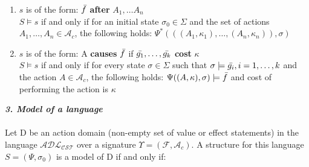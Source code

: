 \documentclass[a4paper]{article}
\begin{document}
\begin{enumerate}
    \item $s$ is of the form: $\Bar{f}$ \textbf{after} $A_1,\dotsc A_n$ \\[0.5\baselineskip]
    $S\models s$ if and only if for an initial state $\sigma_0\in\Sigma$ and the set of actions $A_1,\dotsc,A_n\in\mathcal{A}_c$, the following holds: $\Psi^\ast(((A_1,\kappa_1),\dotsc,(A_n,\kappa_n)),\sigma)$
    \item $s$ is of the form: A \textbf{causes} $\Bar{f}$ if $\Bar{g_1},\dotsc,\Bar{g_k}$ \textbf{cost} $\kappa$ \\[0.5\baselineskip]
    $S\models s$ if and only if for every state $\sigma\in\Sigma$ such that $\sigma\models\Bar{g_i},i=1,\dotsc,k$ and the action $A\in\mathcal{A}_c$, the following holds: $\Psi((A,\kappa),\sigma)\models\Bar{f}$ and cost of performing the action is $\kappa$
\end{enumerate}
\textbf{\textit{3. Model of a language}}
\\ \\
Let D be an action domain (non-empty set of value or effect statements) in the language $\mathcal{ADL_{CST}}$ over a signature $\Upsilon = (\mathcal{F}, \mathcal{A}_c)$. A structure for this language $S=(\Psi,\sigma_0)$ is a model of D if and only if:
\end{document}
